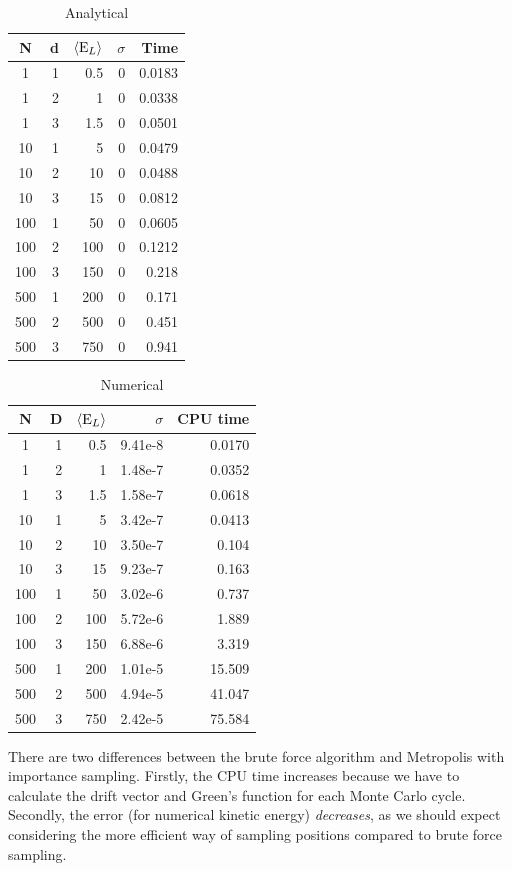 \documentclass[english, a4paper]{article}
\begin{document}
\begin{table}[H]
  \centering
  \begin{tabular}{ | c | r | r | r | r |}
    \hline
    N& d& $\langle {\textrm E_L}\rangle$& $\sigma$& Time \\*
    \hline
    1& 1& 0.5& 0& 0.0183 \\*
    \hline
    1& 2& 1& 0&  0.0338\\*
    \hline
    1& 3& 1.5& 0&  0.0501\\*
    \hline
    10& 1& 5& 0&  0.0479\\*
    \hline
    10& 2& 10& 0&  0.0488\\*
    \hline
    10& 3& 15& 0&  0.0812\\*
    \hline
    100& 1& 50& 0&  0.0605\\*
    \hline
    100& 2& 100& 0&  0.1212\\*
    \hline
    100& 3& 150& 0&  0.218\\*
    \hline
    500& 1& 200& 0&  0.171\\*
    \hline
    500& 2& 500& 0&  0.451\\*
    \hline
    500& 3& 750& 0&  0.941\\*
    \hline
  \end{tabular}
  \caption{Analytical}
  \label{tab:Tabell1}
\end{table}

\begin{table}[H]
  \centering
  \begin{tabular}{ | c | r | r | r | r |}
    \hline
    N& D& $\langle {\textrm E_L}\rangle$& $\sigma$& CPU time \\*
    \hline
    1& 1& 0.5& 9.41e-8& 0.0170 \\*
    \hline
    1& 2& 1& 1.48e-7&  0.0352\\*
    \hline
    1& 3& 1.5& 1.58e-7&  0.0618\\*
    \hline
    10& 1& 5& 3.42e-7&  0.0413\\*
    \hline
    10& 2& 10& 3.50e-7&  0.104\\*
    \hline
    10& 3& 15& 9.23e-7&  0.163\\*
    \hline
    100& 1& 50& 3.02e-6&  0.737\\*
    \hline
    100& 2& 100& 5.72e-6&  1.889\\*
    \hline
    100& 3& 150& 6.88e-6&  3.319\\*
    \hline
    500& 1& 200& 1.01e-5&  15.509\\*
    \hline
    500& 2& 500& 4.94e-5&  41.047\\*
    \hline
    500& 3& 750& 2.42e-5&  75.584\\*
    \hline
  \end{tabular}
  \caption{Numerical}
  \label{tab:Tabell1}
\end{table}
There are two differences between the brute force algorithm and Metropolis with importance sampling.
Firstly, the CPU time increases because we have to calculate the drift vector and Green's function for each Monte Carlo cycle.
Secondly, the error (for numerical kinetic energy) \textit{decreases}, as we should expect considering the more efficient
way of sampling positions compared to brute force sampling. \\
\end{document}
